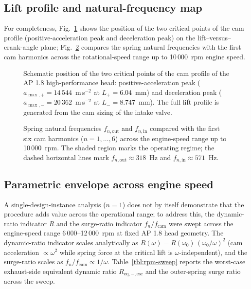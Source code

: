 \subsection{Lift profile and natural-frequency map}
\label{sec:res-curves}

For completeness, Fig.~\ref{fig:lift} shows the position of the two
critical points of the cam profile (positive-acceleration peak and
deceleration peak) on the lift--versus--crank-angle plane;
Fig.~\ref{fig:fn} compares the spring natural frequencies with the
first cam harmonics across the rotational-speed range up to
10\,000~rpm engine speed.

\begin{figure}[!htbp]
 \centering
 \resizebox{\linewidth}{!}{}
 \caption{Schematic position of the two critical points of the cam profile of the AP 1.8 high-performance head: positive-acceleration peak ($a_{\max,+}=14\,544$~m\,s$^{-2}$ at $L_{+}=6.04$~mm) and deceleration peak ($a_{\max,-}=20\,362$~m\,s$^{-2}$ at $L_{-}=8.747$~mm). The full lift profile is generated from the cam sizing of the intake valve.}\label{fig:lift}
\end{figure}

\begin{figure}[!htbp]
 \centering
 \resizebox{\linewidth}{!}{}
 \caption{Spring natural frequencies $f_{n,\mathrm{out}}$ and $f_{n,\mathrm{in}}$ compared with the first six cam harmonics ($n=1,\dots,6$) across the engine-speed range up to 10\,000~rpm. The shaded region marks the operating regime; the dashed horizontal lines mark $f_{n,\mathrm{out}}\approx 318$~Hz and $f_{n,\mathrm{in}}\approx 571$~Hz.}\label{fig:fn}
\end{figure}

\subsection{Parametric envelope across engine speed}
\label{sec:res-envelope}

A single-design-instance analysis ($n=1$) does not by itself
demonstrate that the procedure adds value across the operational
range; to address this, the dynamic-ratio indicator $R$ and the
surge-ratio indicator $f_{n}/f_{\mathrm{cam}}$ were swept across the
engine-speed range 6\,000--12\,000~rpm at fixed AP 1.8 head
geometry. The dynamic-ratio indicator scales analytically as
$R(\omega)=R(\omega_{0})\,(\omega_{0}/\omega)^{2}$ (cam acceleration
$\propto \omega^{2}$ while spring force at the critical lift is
$\omega$-independent), and the surge-ratio scales as
$f_{n}/f_{\mathrm{cam}}\propto 1/\omega$. Table~\ref{tbl:rpm-sweep}
reports the worst-case exhaust-side equivalent dynamic ratio
$R_{\mathrm{eq},-,\mathrm{esc}}$ and the outer-spring surge ratio
across the sweep.

